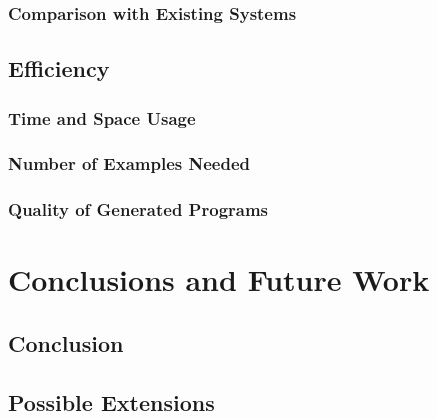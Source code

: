 \documentclass[a4paper,twoside,notitlepage]{article}
\begin{document}
\subsubsection{Comparison with Existing Systems}
\subsection{Efficiency}
\subsubsection{Time and Space Usage}
\subsubsection{Number of Examples Needed}
\subsubsection{Quality of Generated Programs}

\section{Conclusions and Future Work}
\subsection{Conclusion}
\subsection{Possible Extensions}
\end{document}
